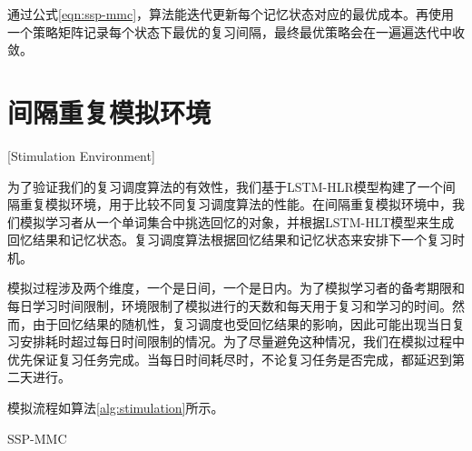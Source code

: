 通过公式\ref{eqn:ssp-mmc}，算法能迭代更新每个记忆状态对应的最优成本。再使用一个策略矩阵记录每个状态下最优的复习间隔，最终最优策略会在一遍遍迭代中收敛。

\section{间隔重复模拟环境}[Stimulation Environment]

为了验证我们的复习调度算法的有效性，我们基于LSTM-HLR模型构建了一个间隔重复模拟环境，用于比较不同复习调度算法的性能。在间隔重复模拟环境中，我们模拟学习者从一个单词集合中挑选回忆的对象，并根据LSTM-HLT模型来生成回忆结果和记忆状态。复习调度算法根据回忆结果和记忆状态来安排下一个复习时机。

模拟过程涉及两个维度，一个是日间，一个是日内。为了模拟学习者的备考期限和每日学习时间限制，环境限制了模拟进行的天数和每天用于复习和学习的时间。然而，由于回忆结果的随机性，复习调度也受回忆结果的影响，因此可能出现当日复习安排耗时超过每日时间限制的情况。为了尽量避免这种情况，我们在模拟过程中优先保证复习任务完成。当每日时间耗尽时，不论复习任务是否完成，都延迟到第二天进行。

模拟流程如算法\ref{alg:stimulation}所示。

\begin{algorithm}[htbp]
\caption{SSP-MMC}
\label{alg:stimulation}
\end{algorithm}

